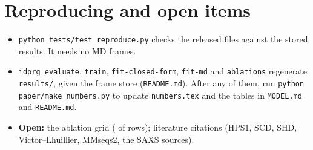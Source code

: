 \documentclass[11pt]{article}
\begin{document}
\section{Reproducing and open items}
\begin{itemize}
\item \texttt{python tests/test\_reproduce.py} checks the released files against the stored results. It needs no MD
  frames.
\item \texttt{idprg evaluate}, \texttt{train}, \texttt{fit-closed-form}, \texttt{fit-md} and \texttt{ablations}
  regenerate \texttt{results/}, given the frame store (\texttt{README.md}). After any of them, run
  \texttt{python paper/make\_numbers.py} to update \texttt{numbers.tex} and the tables in \texttt{MODEL.md} and
  \texttt{README.md}.
\item \textbf{Open:} the ablation grid ( of  rows); literature citations (HPS1, SCD,
  SHD, Victor--Lhuillier, MMseqs2, the SAXS sources).
\end{itemize}
\end{document}
